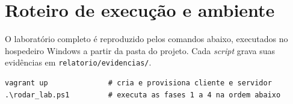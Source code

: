 \newcommand{\codigo}[2]{%
  \par\medskip\noindent\textbf{#2} (\texttt{\detokenize{#1}})\par
  \IfFileExists{anexos/codigo/#1}{%
    \VerbatimInput[fontsize=\scriptsize,breaklines,breakanywhere,frame=single,framesep=2mm,numbers=left,numbersep=4pt]{anexos/codigo/#1}}{%
    \textcolor{red}{Arquivo anexos/codigo/\detokenize{#1} não encontrado.}}\par}

\chapter{Roteiro de execução e ambiente}\label{anexo:roteiro}

O laboratório completo é reproduzido pelos comandos abaixo, executados no hospedeiro
Windows a partir da pasta do projeto. Cada \textit{script} grava suas evidências em
\texttt{relatorio/evidencias/}.

\begin{Verbatim}[fontsize=\footnotesize,frame=single,framesep=2mm]
vagrant up              # cria e provisiona cliente e servidor
.\rodar_lab.ps1         # executa as fases 1 a 4 na ordem abaixo
\end{Verbatim}

